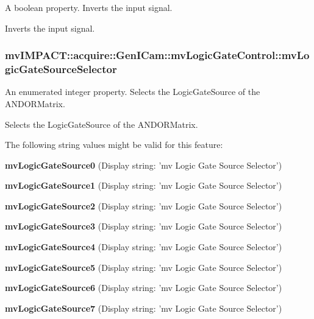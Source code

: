 A boolean property. Inverts the input signal. 

Inverts the input signal. \hypertarget{classmv_i_m_p_a_c_t_1_1acquire_1_1_gen_i_cam_1_1mv_logic_gate_control_a2cf94ca87af9ebd46fda681f936d3a11}{
\subsubsection[{mv\+Logic\+Gate\+Source\+Selector}]{ mv\+I\+M\+P\+A\+C\+T\+::acquire\+::\+Gen\+I\+Cam\+::mv\+Logic\+Gate\+Control\+::mv\+Logic\+Gate\+Source\+Selector}}\label{classmv_i_m_p_a_c_t_1_1acquire_1_1_gen_i_cam_1_1mv_logic_gate_control_a2cf94ca87af9ebd46fda681f936d3a11}


An enumerated integer property. Selects the Logic\+Gate\+Source of the A\+N\+D\+O\+R\+Matrix. 

Selects the Logic\+Gate\+Source of the A\+N\+D\+O\+R\+Matrix.

The following string values might be valid for this feature\+:
\begin{DoxyItemize}
\item {\bfseries mv\+Logic\+Gate\+Source0} (Display string\+: 'mv Logic Gate Source Selector')
\item {\bfseries mv\+Logic\+Gate\+Source1} (Display string\+: 'mv Logic Gate Source Selector')
\item {\bfseries mv\+Logic\+Gate\+Source2} (Display string\+: 'mv Logic Gate Source Selector')
\item {\bfseries mv\+Logic\+Gate\+Source3} (Display string\+: 'mv Logic Gate Source Selector')
\item {\bfseries mv\+Logic\+Gate\+Source4} (Display string\+: 'mv Logic Gate Source Selector')
\item {\bfseries mv\+Logic\+Gate\+Source5} (Display string\+: 'mv Logic Gate Source Selector')
\item {\bfseries mv\+Logic\+Gate\+Source6} (Display string\+: 'mv Logic Gate Source Selector')
\item {\bfseries mv\+Logic\+Gate\+Source7} (Display string\+: 'mv Logic Gate Source Selector')
\end{DoxyItemize}

